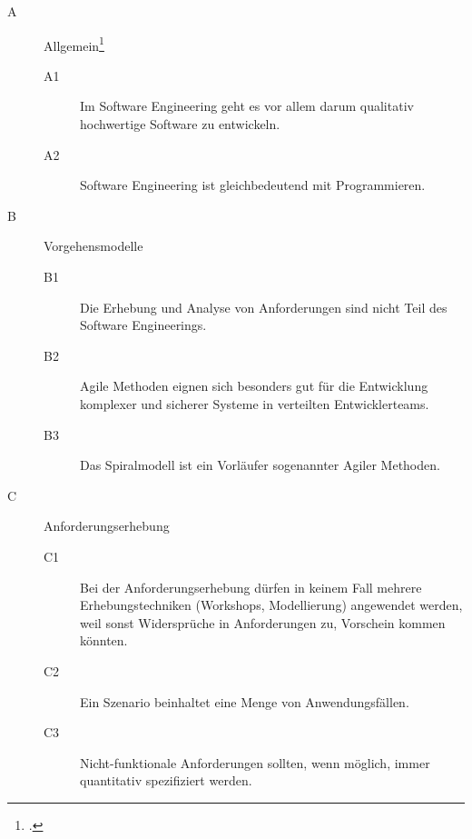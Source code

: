\documentclass{lehramt-informatik-aufgabe}
\begin{document}
\begin{description}

%

\item[A] Allgemein\footcite[Thema 2 Teilaufgabe 2 Aufgabe 1]{examen:66116:2016:09}

\begin{description}
\item[A1] Im Software Engineering
geht es vor allem darum qualitativ hochwertige Software zu entwickeln.

\item[A2] Software Engineering ist gleichbedeutend mit
Programmieren.
\end{description}

%

\item[B] Vorgehensmodelle

\begin{description}
\item[B1] Die Erhebung und Analyse von Anforderungen sind nicht Teil des
Software Engineerings.

\item[B2] Agile Methoden eignen sich besonders gut
für die Entwicklung komplexer und sicherer Systeme in verteilten
Entwicklerteams.

\item[B3] Das Spiralmodell ist ein Vorläufer
sogenannter Agiler Methoden.
\end{description}

%

\item[C] Anforderungserhebung

\begin{description}
\item[C1] Bei der Anforderungserhebung dürfen in keinem Fall mehrere
Erhebungstechniken (\zB Workshops, Modellierung) angewendet werden,
weil sonst Widersprüche in Anforderungen zu, Vorschein kommen könnten.

\item[C2] Ein Szenario beinhaltet eine Menge von Anwendungsfällen.

\item[C3] Nicht-funktionale Anforderungen sollten, wenn möglich, immer quantitativ spezifiziert
werden.
\end{description}

%


\end{description}
\end{document}
